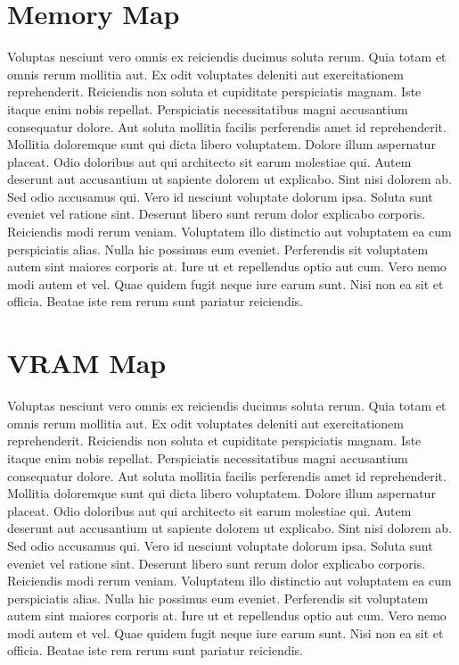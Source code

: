 \documentclass[
	11pt, %
	fleqn, %
	letterpaper, %
]{CommodoreBlueBook}
\begin{document}
\chapter*{Memory Map}

Voluptas nesciunt vero omnis ex reiciendis ducimus soluta rerum. Quia totam et
omnis rerum mollitia aut. Ex odit voluptates deleniti aut exercitationem
reprehenderit. Reiciendis non soluta et cupiditate perspiciatis magnam. Iste
itaque enim nobis repellat. Perspiciatis necessitatibus magni accusantium
consequatur dolore. Aut soluta mollitia facilis perferendis amet id
reprehenderit. Mollitia doloremque sunt qui dicta libero voluptatem. Dolore
illum aspernatur placeat. Odio doloribus aut qui architecto sit earum molestiae
qui. Autem deserunt aut accusantium ut sapiente dolorem ut explicabo. Sint nisi
dolorem ab. Sed odio accusamus qui. Vero id nesciunt voluptate dolorum ipsa.
Soluta sunt eveniet vel ratione sint. Deserunt libero sunt rerum dolor
explicabo corporis. Reiciendis modi rerum veniam. Voluptatem illo distinctio
aut voluptatem ea cum perspiciatis alias. Nulla hic possimus eum eveniet.
Perferendis sit voluptatem autem sint maiores corporis at. Iure ut et
repellendus optio aut cum. Vero nemo modi autem et vel. Quae quidem fugit neque
iure earum sunt. Nisi non ea sit et officia. Beatae iste rem rerum sunt
pariatur reiciendis.

\chapter*{VRAM Map}

Voluptas nesciunt vero omnis ex reiciendis ducimus soluta rerum. Quia totam et
omnis rerum mollitia aut. Ex odit voluptates deleniti aut exercitationem
reprehenderit. Reiciendis non soluta et cupiditate perspiciatis magnam. Iste
itaque enim nobis repellat. Perspiciatis necessitatibus magni accusantium
consequatur dolore. Aut soluta mollitia facilis perferendis amet id
reprehenderit. Mollitia doloremque sunt qui dicta libero voluptatem. Dolore
illum aspernatur placeat. Odio doloribus aut qui architecto sit earum molestiae
qui. Autem deserunt aut accusantium ut sapiente dolorem ut explicabo. Sint nisi
dolorem ab. Sed odio accusamus qui. Vero id nesciunt voluptate dolorum ipsa.
Soluta sunt eveniet vel ratione sint. Deserunt libero sunt rerum dolor
explicabo corporis. Reiciendis modi rerum veniam. Voluptatem illo distinctio
aut voluptatem ea cum perspiciatis alias. Nulla hic possimus eum eveniet.
Perferendis sit voluptatem autem sint maiores corporis at. Iure ut et
repellendus optio aut cum. Vero nemo modi autem et vel. Quae quidem fugit neque
iure earum sunt. Nisi non ea sit et officia. Beatae iste rem rerum sunt
pariatur reiciendis.
\end{document}
